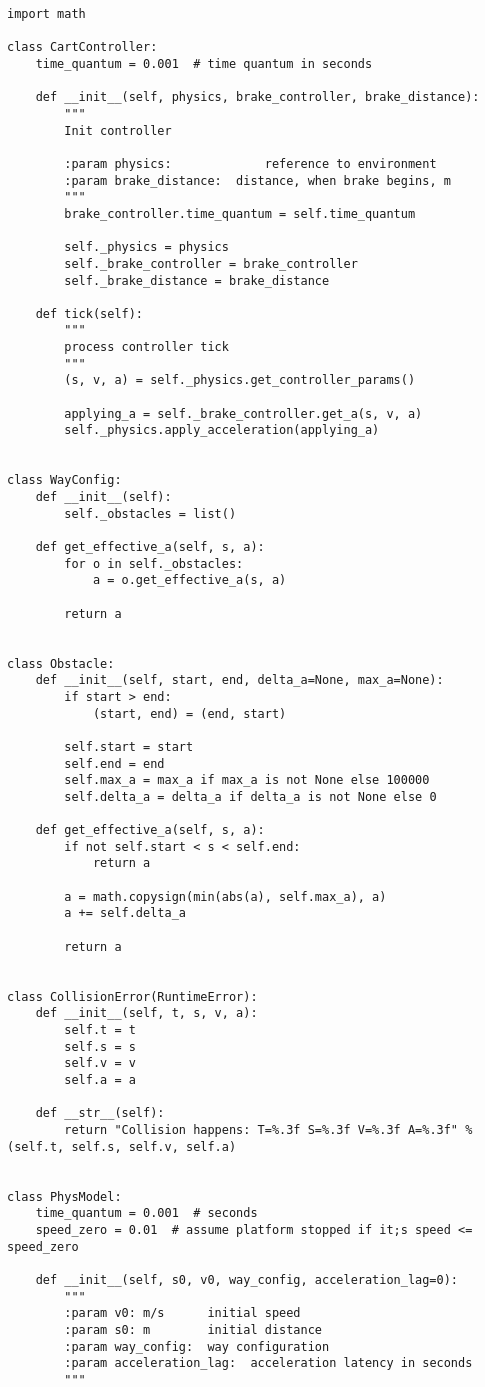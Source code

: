 \begin{lstlisting}[style=pythonstyle,caption={ }, label=lst:func:1]
import math

class CartController:
	time_quantum = 0.001  # time quantum in seconds

	def __init__(self, physics, brake_controller, brake_distance):
		"""
		Init controller

		:param physics:				reference to environment
		:param brake_distance: 	distance, when brake begins, m
		"""
		brake_controller.time_quantum = self.time_quantum

		self._physics = physics
		self._brake_controller = brake_controller
		self._brake_distance = brake_distance

	def tick(self):
		"""
		process controller tick
		"""
		(s, v, a) = self._physics.get_controller_params()

		applying_a = self._brake_controller.get_a(s, v, a)
		self._physics.apply_acceleration(applying_a)


class WayConfig:
	def __init__(self):
		self._obstacles = list()

	def get_effective_a(self, s, a):
		for o in self._obstacles:
			a = o.get_effective_a(s, a)

		return a


class Obstacle:
	def __init__(self, start, end, delta_a=None, max_a=None):
		if start > end:
			(start, end) = (end, start)

		self.start = start
		self.end = end
		self.max_a = max_a if max_a is not None else 100000
		self.delta_a = delta_a if delta_a is not None else 0

	def get_effective_a(self, s, a):
		if not self.start < s < self.end:
			return a

		a = math.copysign(min(abs(a), self.max_a), a)
		a += self.delta_a

		return a


class CollisionError(RuntimeError):
	def __init__(self, t, s, v, a):
		self.t = t
		self.s = s
		self.v = v
		self.a = a

	def __str__(self):
		return "Collision happens: T=%.3f S=%.3f V=%.3f A=%.3f" % (self.t, self.s, self.v, self.a)


class PhysModel:
	time_quantum = 0.001  # seconds
	speed_zero = 0.01  # assume platform stopped if it;s speed <= speed_zero

	def __init__(self, s0, v0, way_config, acceleration_lag=0):
		"""
		:param v0: m/s		initial speed
		:param s0: m		initial distance
		:param way_config:  way configuration
		:param acceleration_lag:  acceleration latency in seconds
		"""


\end{lstlisting}
